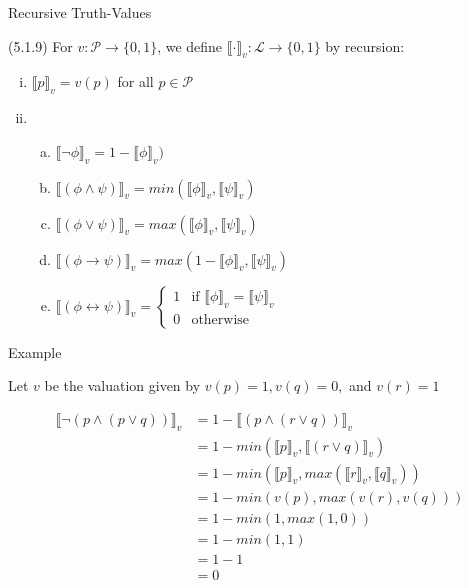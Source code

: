\documentclass[../slides.tex]{subfiles}
\begin{document}
\begin{frame}{Recursive Truth-Values}

(5.1.9) For $v:\mathcal{P}\to\{0,1\}$, we define $\llbracket\cdot\rrbracket_v:\mathcal{L}\to\{0,1\}$ by recursion:

\begin{enumerate}[(i)]
		
			\item  $\llbracket p\rrbracket_v=v(p)$ for all $p\in\mathcal{P}$
			
			\item \begin{enumerate}[(a)]
			
				\item  $\llbracket\neg \phi\rrbracket_v=1-\llbracket\phi\rrbracket_v)$
				
				\item  $\llbracket(\phi\land \psi)\rrbracket_v=min(\llbracket\phi\rrbracket_v, \llbracket\psi\rrbracket_v)$
				\item[] $\llbracket(\phi\lor \psi)\rrbracket_v=max(\llbracket\phi\rrbracket_v, \llbracket\psi\rrbracket_v)$		
				\item[] $\llbracket(\phi\to \psi)\rrbracket_v=max(1-\llbracket\phi\rrbracket_v, \llbracket\psi\rrbracket_v)$		
				
				\item[] $\llbracket(\phi\leftrightarrow \psi)\rrbracket_v=\begin{cases} 1 & \text{if } \llbracket\phi\rrbracket_v=\llbracket\psi\rrbracket_v\\0&\text{otherwise}\end{cases}$		
	
			\end{enumerate}			
		\end{enumerate}


\end{frame}

\begin{frame}{Example}

Let $v$ be the valuation given by $v(p)=1,v(q)=0,$ and $v(r)=1$

\begin{align*}
		\llbracket \neg (p\land (p\lor q))\rrbracket_v &=1-\llbracket (p\land (r\lor q))\rrbracket_v\tag{ii.a}\\
		&=1-min(\llbracket p\rrbracket_v, \llbracket (r\lor q)\rrbracket_v)\tag{ii.b}\\
		&=1-min(\llbracket p\rrbracket_v, max(\llbracket r\rrbracket_v,\llbracket q\rrbracket_v))\tag{ii.b}\\
		&=1-min(v(p), max(v(r), v(q)))\tag{i}\\
		&=1-min(1, max(1,0))\tag{given}\\
		&=1-min(1,1)\\
		&=1-1\\
		&=0
		\end{align*}

\end{frame}
\end{document}
